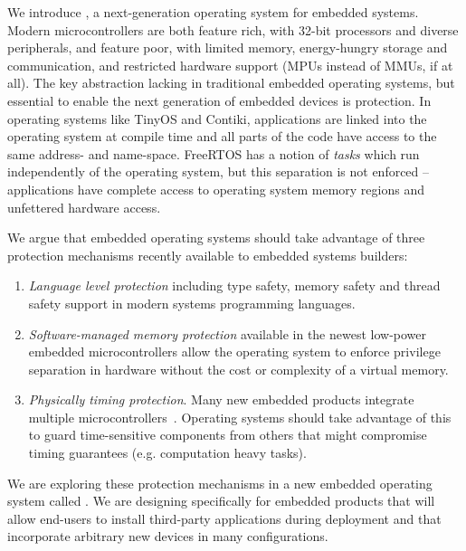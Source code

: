 We introduce \name, a next-generation operating system for embedded systems.
Modern microcontrollers are both feature rich, with 32-bit processors and
diverse peripherals, and feature poor, with limited memory, energy-hungry
storage and communication, and restricted hardware support (MPUs instead of
MMUs, if at all).
The key abstraction lacking in traditional embedded operating systems, but
essential to enable the next generation of embedded devices is protection. In
operating systems like TinyOS and Contiki, applications are linked into the
operating system at compile time and all parts of the code have access to the
same address- and name-space. FreeRTOS has a notion of \emph{tasks} which run
independently of the operating system, but this separation is not enforced --
applications have complete access to operating system memory regions and
unfettered hardware access.

We argue that embedded operating systems should take advantage of three
protection mechanisms recently available to embedded systems builders:

\begin{enumerate}
  \item \emph{Language level protection} including type safety, memory safety
    and thread safety support in modern systems programming languages.
  \item \emph{Software-managed memory protection} available in the newest
    low-power embedded microcontrollers allow the operating system to enforce
    privilege separation in hardware without the cost or complexity of a virtual
    memory.
  \item \emph{Physically timing protection}. Many new embedded products
    integrate multiple microcontrollers~.
  Operating systems should take advantage of this to guard time-sensitive
  components from others that might compromise timing guarantees (e.g.
  computation heavy tasks).
\end{enumerate}

We are exploring these protection mechanisms in a new embedded operating system
called \name. We are designing \name specifically for embedded products that
will allow end-users to install third-party applications during deployment and
that incorporate arbitrary new devices in many configurations.

